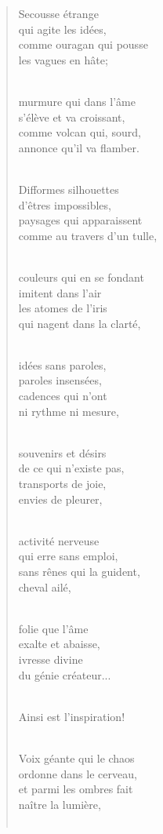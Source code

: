 \documentclass[a4paper,11pt]{book}
\begin{document}
\begin{verse}
Secousse étrange \\
qui agite les idées, \\
comme ouragan qui pousse \\
les vagues en hâte; \\ \

murmure qui dans l'âme \\
s'élève et va croissant, \\
comme volcan qui, sourd, \\
annonce qu'il va flamber. \\ \

Difformes silhouettes \\
d'êtres impossibles, \\
paysages qui apparaissent \\
comme au travers d'un tulle, \\ \

couleurs qui en se fondant \\
imitent dans l'air \\
les atomes de l'iris \\
qui nagent dans la clarté, \\ \

idées sans paroles, \\
paroles insensées, \\
cadences qui n'ont \\
ni rythme ni mesure, \\ \

souvenirs et désirs \\
de ce qui n'existe pas, \\
transports de joie, \\
envies de pleurer, \\ \

activité nerveuse \\
qui erre sans emploi, \\
sans rênes qui la guident, \\
cheval ailé, \\ \

folie que l'âme \\
exalte et abaisse, \\
ivresse divine \\
du génie créateur... \\ \

Ainsi est l'inspiration! \\ \

Voix géante qui le chaos \\
ordonne dans le cerveau, \\
et parmi les ombres fait \\
naître la lumière, \\ \


\end{verse}
\end{document}
